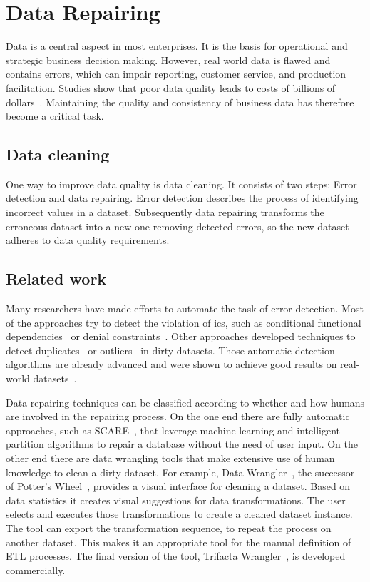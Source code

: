 
\section{Data Repairing}\label{sec:introduction}
  Data is a central aspect in most enterprises.
  It is the basis for operational and strategic business decision making.
  However, real world data is flawed and contains errors, which can impair reporting, customer service, and production facilitation.
  Studies show that poor data quality leads to costs of billions of dollars~\cite{Redman:quality_disaster, cost_of_low_qual}.
  Maintaining the quality and consistency of business data has therefore become a critical task.

  \subsection{Data cleaning}
  One way to improve data quality is data cleaning.
  It consists of two steps: Error detection and data repairing.
  Error detection describes the process of identifying incorrect values in a dataset.
  Subsequently data repairing transforms the erroneous dataset into a new one removing detected errors, so the new dataset adheres to data quality requirements.

  \subsection{Related work}
  Many researchers have made efforts to automate the task of error detection.
  Most of the approaches try to detect the violation of \glspl{ic}, such as conditional functional dependencies~\cite{bohannon2007conditional} or denial constraints~\cite{chu2013discoveringdc}.
  Other approaches developed techniques to detect duplicates~\cite{koudas2006record,naumann2010introduction} or outliers~\cite{das2007detecting,hellerstein2008quantitative} in dirty datasets.
  Those automatic detection algorithms are already advanced and were shown to achieve good results on real-world datasets~\cite{abedjan2016detecting}.

  Data repairing techniques can be classified according to whether and how humans are involved in the repairing process.
  On the one end there are fully automatic approaches, such as SCARE~\cite{scare}, that leverage machine learning and intelligent partition algorithms to repair a database without the need of user input.
  On the other end there are data wrangling tools that make extensive use of human knowledge to clean a dirty dataset.
  For example, Data Wrangler~\cite{data_wrangler}, the successor of Potter's Wheel~\cite{potters_wheel}, provides a visual interface for cleaning a dataset.
  Based on data statistics it creates visual suggestions for data transformations.
  The user selects and executes those transformations to create a cleaned dataset instance.
  The tool can export the transformation sequence, to repeat the process on another dataset.
  This makes it an appropriate tool for the manual definition of ETL processes.
  The final version of the tool, Trifacta Wrangler~\cite{trifacta_wrangler}, is developed commercially.

